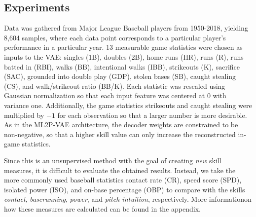 \subsection{Experiments}
Data was gathered from Major League Baseball players from 1950-2018, yielding 8,604 samples, where each data point corresponds to a particular player's performance in a particular year. 13 measurable game statistics were chosen as inputs to the VAE: singles (1B), doubles (2B), home runs (HR), runs (R), runs batted in (RBI), walks (BB), intentional walks (IBB), strikeouts (K), sacrifice (SAC), grounded into double play (GDP), stolen bases (SB), caught stealing (CS), and walk/strikeout ratio (BB/K). Each statistic was rescaled using Gaussian normalization so that each input feature was centered at 0 with variance one. Additionally, the game statistics strikeouts and caught stealing were multiplied by $-1$ for each observation so that a larger number is more desirable. As in the ML2P-VAE architecture, the decoder weights are constrained to be non-negative, so that a higher skill value can only increase the reconstructed in-game statistics.

Since this is an unsupervised method with the goal of creating \textit{new} skill measures, it is difficult to evaluate the obtained results. Instead, we take the more commonly used baseball statistics contact rate (CR), speed score (SPD), isolated power (ISO), and on-base percentage (OBP) to compare with the skills \textit{contact}, \textit{baserunning}, \textit{power}, and \textit{pitch intuition}, respectively. More informationon how these measures are calculated can be found in the appendix. 

